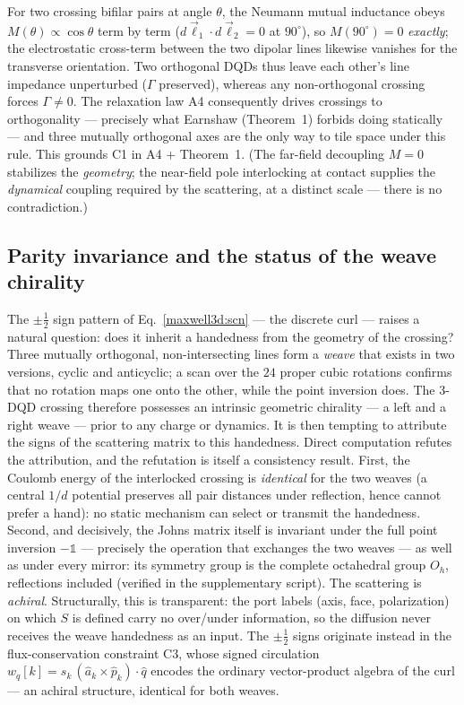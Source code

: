 \documentclass[11pt,a4paper]{article}
\theoremstyle{plain}
\theoremstyle{remark}
\begin{document}
\noindent For two crossing bifilar pairs at angle $\theta$, the Neumann mutual inductance obeys $M(\theta)\propto\cos\theta$ term by term ($d\vec\ell_1\!\cdot\!d\vec\ell_2 = 0$ at $90^\circ$), so $M(90^\circ)=0$ \emph{exactly}; the electrostatic cross-term between the two dipolar lines likewise vanishes for the transverse orientation. Two orthogonal DQDs thus leave each other's line impedance unperturbed ($\Gamma$ preserved), whereas any non-orthogonal crossing forces $\Gamma\neq0$. The relaxation law A4 consequently drives crossings to orthogonality --- precisely what Earnshaw (Theorem~1) forbids doing statically --- and three mutually orthogonal axes are the only way to tile space under this rule. This grounds C1 in A4 + Theorem~1. (The far-field decoupling $M=0$ stabilizes the \emph{geometry}; the near-field pole interlocking at contact supplies the \emph{dynamical} coupling required by the scattering, at a distinct scale --- there is no contradiction.)

\subsection{Parity invariance and the status of the weave chirality}
\label{maxwell3d:chirality}

The $\pm\tfrac12$ sign pattern of Eq.~\eqref{maxwell3d:scn} --- the discrete curl --- raises a natural question: does it inherit a handedness from the geometry of the crossing? Three mutually orthogonal, non-intersecting lines form a \emph{weave} that exists in two versions, cyclic and anticyclic; a scan over the $24$ proper cubic rotations confirms that no rotation maps one onto the other, while the point inversion does. The 3-DQD crossing therefore possesses an intrinsic geometric chirality --- a left and a right weave --- prior to any charge or dynamics. It is then tempting to attribute the signs of the scattering matrix to this handedness. Direct computation refutes the attribution, and the refutation is itself a consistency result. First, the Coulomb energy of the interlocked crossing is \emph{identical} for the two weaves (a central $1/d$ potential preserves all pair distances under reflection, hence cannot prefer a hand): no static mechanism can select or transmit the handedness. Second, and decisively, the Johns matrix itself is invariant under the full point inversion $-\mathbb{1}$ --- precisely the operation that exchanges the two weaves --- as well as under every mirror: its symmetry group is the complete octahedral group $O_h$, reflections included (verified in the supplementary script). The scattering is \emph{achiral}. Structurally, this is transparent: the port labels (axis, face, polarization) on which $S$ is defined carry no over/under information, so the diffusion never receives the weave handedness as an input. The $\pm\tfrac12$ signs originate instead in the flux-conservation constraint C3, whose signed circulation $w_q[k]=s_k\,(\hat a_k\times\hat p_k)\cdot\hat q$ encodes the ordinary vector-product algebra of the curl --- an achiral structure, identical for both weaves.
\end{document}
